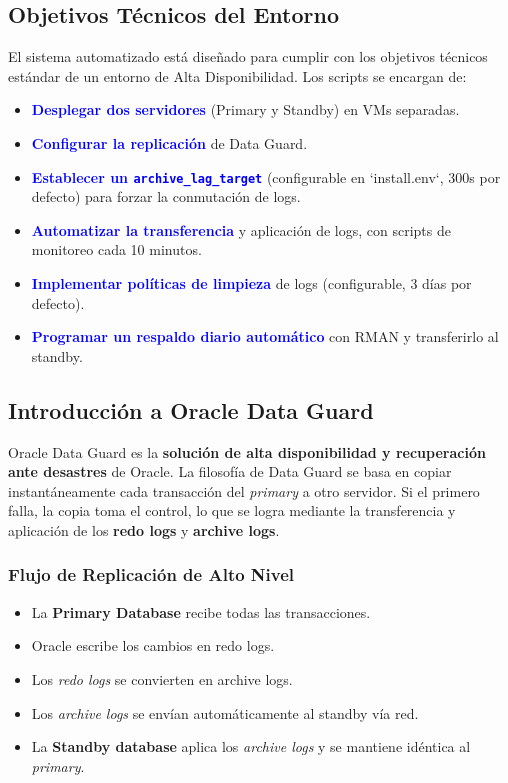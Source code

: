 \documentclass[11pt, a4paper]{report}
\newcommand{\destacado}[1]{\textbf{\textcolor{blue}{#1}}}
\begin{document}
\subsection{Objetivos Técnicos del Entorno}

El sistema automatizado está diseñado para cumplir con los objetivos técnicos estándar de un entorno de Alta Disponibilidad. Los scripts se encargan de:
\begin{itemize}
    \item \destacado{Desplegar dos servidores} (Primary y Standby) en VMs separadas.
    \item \destacado{Configurar la replicación} de Data Guard.
    \item \destacado{Establecer un \texttt{archive\_lag\_target}} (configurable en `install.env`, 300s por defecto) para forzar la conmutación de logs.
    \item \destacado{Automatizar la transferencia} y aplicación de logs, con scripts de monitoreo cada 10 minutos.
    \item \destacado{Implementar políticas de limpieza} de logs (configurable, 3 días por defecto).
    \item \destacado{Programar un respaldo diario automático} con RMAN y transferirlo al standby.
\end{itemize}

\subsection{Introducción a Oracle Data Guard}

Oracle Data Guard es la \textbf{solución de alta disponibilidad y recuperación ante desastres} de Oracle.
La filosofía de Data Guard se basa en copiar instantáneamente cada transacción del \textit{primary} a otro servidor. Si el primero falla, la copia toma el control, lo que se logra mediante la transferencia y aplicación de los \textbf{redo logs} y \textbf{archive logs}.

\subsubsection{Flujo de Replicación de Alto Nivel}

\begin{itemize}
    \item La \textbf{Primary Database} recibe todas las transacciones.
\item Oracle escribe los cambios en redo logs.
    \item Los \textit{redo logs} se convierten en archive logs.
\item Los \textit{archive logs} se envían automáticamente al standby vía red.
\item La \textbf{Standby database} aplica los \textit{archive logs} y se mantiene idéntica al \textit{primary}.
\end{itemize}
\end{document}
